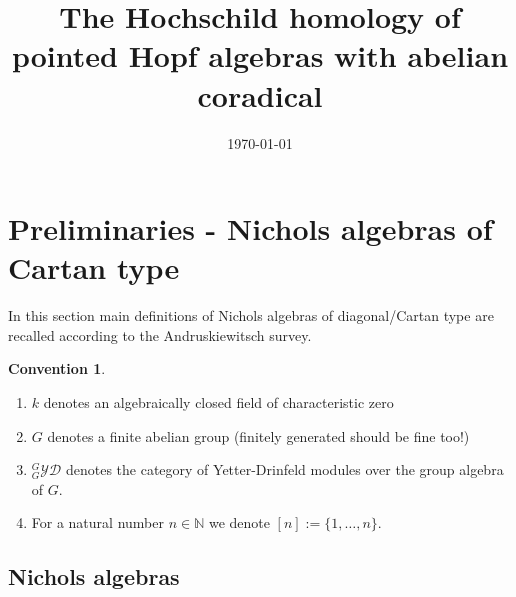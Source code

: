 \documentclass{amsart}
\author{}
\date{\today}
\title{The Hochschild homology of pointed Hopf algebras with abelian coradical}
\theoremstyle{definition}
\newtheorem*{convention}{Convention}
\newcommand{\YD}[1]{\ensuremath{{}^{#1}_{#1}\mathcal{YD}}}
\begin{document}
	\begin{abstract}
		
	\end{abstract}
	\maketitle
	
	\section{Preliminaries - Nichols algebras of Cartan type}
	
	In this section main definitions of Nichols algebras of diagonal/Cartan type are recalled according to the Andruskiewitsch survey. 
	
	\begin{convention} $ $ \\
		\begin{enumerate}
			\item $k$ denotes an algebraically closed field of characteristic zero
			\item $G$ denotes a finite abelian group (finitely generated should be fine too!)
			\item $\YD G$ denotes the category of Yetter-Drinfeld modules over the group algebra of $G$.
			\item For a natural number $n\in \mathbb N$ we denote $[n]:= \{1,\dotsc, n\}$.
		\end{enumerate}
	\end{convention}
	
	\subsection{Nichols algebras}
	
\end{document}
